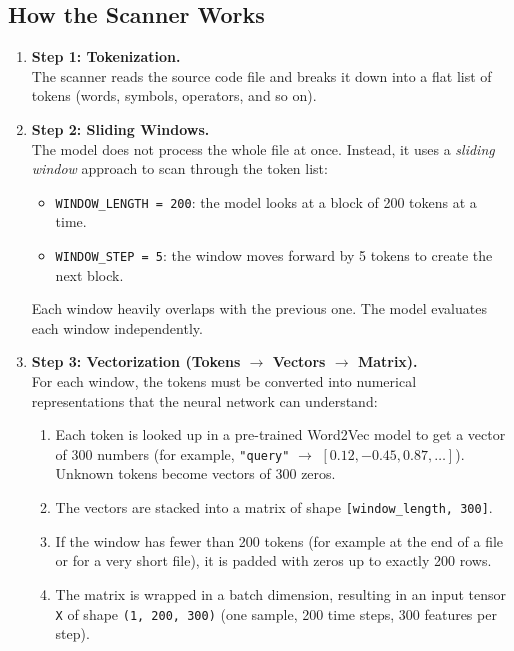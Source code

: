 \subsection{How the Scanner Works}
\label{sec:ml_part1}

\begin{enumerate}
  \item \textbf{Step 1: Tokenization.}\\
  The scanner reads the source code file and breaks it down into a flat list of tokens
  (words, symbols, operators, and so on).

  \item \textbf{Step 2: Sliding Windows.}\\
  The model does not process the whole file at once. Instead, it uses a \emph{sliding window}
  approach to scan through the token list:
  \begin{itemize}
    \item \texttt{WINDOW\_LENGTH = 200}: the model looks at a block of 200 tokens at a time.
    \item \texttt{WINDOW\_STEP = 5}: the window moves forward by 5 tokens to create the next block.
  \end{itemize}
  Each window heavily overlaps with the previous one. The model evaluates each window
  independently.

  \item \textbf{Step 3: Vectorization (Tokens $\rightarrow$ Vectors $\rightarrow$ Matrix).}\\
  For each window, the tokens must be converted into numerical representations that the
  neural network can understand:
  \begin{enumerate}
    \item Each token is looked up in a pre-trained Word2Vec model to get a vector of 300
    numbers (for example, \texttt{"query"} $\rightarrow$ \([0.12, -0.45, 0.87, \ldots]\)).
    Unknown tokens become vectors of 300 zeros.
    \item The vectors are stacked into a matrix of shape \texttt{[window\_length, 300]}.
    \item If the window has fewer than 200 tokens (for example at the end of a file or for a
    very short file), it is padded with zeros up to exactly 200 rows.
    \item The matrix is wrapped in a batch dimension, resulting in an input tensor
    \texttt{X} of shape \texttt{(1, 200, 300)} (one sample, 200 time steps, 300 features per step).
  \end{enumerate}


\end{enumerate}
